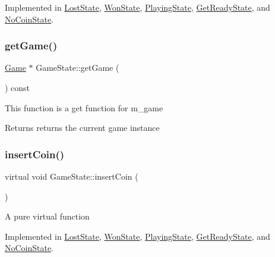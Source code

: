 Implemented in \hyperlink{class_lost_state_acfdefa77d7ed756a1052d39ed2de8786}{Lost\+State}, \hyperlink{class_won_state_a88bcef07ae234fe7ba672d1c6628d2c0}{Won\+State}, \hyperlink{class_playing_state_aa6c7033a5c734ba1ae4aae0905554d61}{Playing\+State}, \hyperlink{class_get_ready_state_a5526ece0f8f8becab78b78fbc7919045}{Get\+Ready\+State}, and \hyperlink{class_no_coin_state_ab1e920e22b90f9d36954e75ea49c3f9b}{No\+Coin\+State}.

\mbox{\label{class_game_state_a7f1afbce585f48311006ddb00c26e32f}} 
\subsubsection{\texorpdfstring{get\+Game()}{getGame()}}
{\footnotesize\ttfamily \hyperlink{class_game}{Game} $\ast$ Game\+State\+::get\+Game (\begin{DoxyParamCaption}{ }\end{DoxyParamCaption}) const}

This function is a get function for m\+\_\+game

\begin{DoxyReturn}{Returns}
returns the current game instance 
\end{DoxyReturn}
\mbox{\label{class_game_state_a4cd6f5b4ad23fc08dca287df26d94b94}} 
\subsubsection{\texorpdfstring{insert\+Coin()}{insertCoin()}}
{\footnotesize\ttfamily virtual void Game\+State\+::insert\+Coin (\begin{DoxyParamCaption}{ }\end{DoxyParamCaption})\hspace{0.3cm}{\ttfamily [pure virtual]}}

A pure virtual function 

Implemented in \hyperlink{class_lost_state_aa35179942033d9ab54fbcd7122f40497}{Lost\+State}, \hyperlink{class_won_state_aeaab03fa1a39188c19107047417c65b6}{Won\+State}, \hyperlink{class_playing_state_a936d41a2041ace2ccb67a9b779d113a7}{Playing\+State}, \hyperlink{class_get_ready_state_afac1da927d38cf32960f2370856ec9f6}{Get\+Ready\+State}, and \hyperlink{class_no_coin_state_a417209eadad2f71284cf09d369bc389e}{No\+Coin\+State}.

